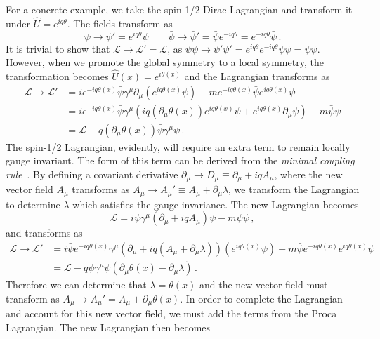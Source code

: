 For a concrete example, we take the spin-1/2 Dirac Lagrangian and transform it under $\hat{U}=e^{iq\theta}$. The fields transform as
\begin{equation}
	\psi\to\psi'=e^{iq\theta}\psi \qquad \bar{\psi}\to\bar{\psi}'= \bar{\psi}e^{-iq\theta} =e^{-iq\theta}\bar{\psi}\,.
\end{equation}
It is trivial to show that $\mathcal{L}\to\mathcal{L}'=\mathcal{L}$, as $\psi\bar{\psi}\to\psi'\bar{\psi}'=e^{iq\theta}e^{-iq\theta}\psi\bar{\psi}=\psi\bar{\psi}$. However, when we promote the global symmetry to a local symmetry, the transformation becomes $\hat{U}(x)=e^{i\theta(x)}$ and the Lagrangian transforms as
\begin{align}
	\mathcal{L}\to\mathcal{L}'&=ie^{-iq\theta(x)}\bar{\psi}\gamma^\mu\partial_\mu(e^{iq\theta(x)}\psi)-me^{-iq\theta(x)}\bar{\psi}e^{iq\theta(x)}\psi\\
	&=ie^{-iq\theta(x)}\bar{\psi}\gamma^\mu\left(iq(\partial_\mu\theta(x))e^{iq\theta(x)}\psi+e^{iq\theta(x)}\partial_\mu\psi\right)-m\bar{\psi}\psi\\
	&=\mathcal{L}-q(\partial_\mu\theta(x))\bar{\psi}\gamma^\mu\psi\,.
\end{align}
The spin-1/2 Lagrangian, evidently, will require an extra term to remain locally gauge invariant. The form of this term can be derived from the \textit{minimal coupling rule}~\cite{griffiths_gauge}. By defining a covariant derivative $\partial_\mu\to D_\mu\equiv\partial_\mu+iqA_\mu$, where the new vector field $A_\mu$ transforms as $A_\mu\to A_\mu'\equiv A_\mu+\partial_\mu\lambda$, we transform the Lagrangian to determine $\lambda$ which satisfies the gauge invariance. The new Lagrangian becomes \begin{equation}
	\mathcal{L}=i\bar{\psi}\gamma^\mu\left(\partial_\mu+iqA_\mu\right)\psi-m\bar{\psi}\psi\,,
\end{equation}
and transforms as
\begin{align}
	\mathcal{L}\to\mathcal{L}'&=i\bar{\psi}e^{-iq\theta(x)}\gamma^\mu\left(\partial_\mu+iq(A_\mu+\partial_\mu\lambda)\right)(e^{iq\theta(x)}\psi)-m\bar{\psi}e^{-iq\theta(x)}e^{iq\theta(x)}\psi\\
	&=\mathcal{L}-q\bar{\psi}\gamma^\mu\psi\left(\partial_\mu\theta(x)-\partial_\mu\lambda\right)\,.
\end{align}
Therefore we can determine that $\lambda=\theta(x)$ and the new vector field must transform as $A_\mu\to A_\mu'=A_\mu+\partial_\mu\theta(x)$. In order to complete the Lagrangian and account for this new vector field, we must add the terms from the Proca Lagrangian. The new Lagrangian then becomes
